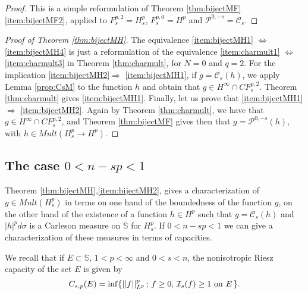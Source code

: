\documentclass[12pt,twoside,leqno,final]{amsart}
\theoremstyle{plain}
\begin{document}
\begin{proof}
This is a simple reformulation of Theorem \ref{thm:bijectMF} \eqref{item:bijectMF2}, applied to $F_s^{p,2}=H_s^p$, $F_s^{p,0}=H^p$ and ${{\mathcal P}}^{0,-s}={\mathcal C}_s$.
\end{proof}

 \begin{proof}[Proof of Theorem \ref{thm:bijectMH}] 

The equivalence \eqref{item:bijectMH1} $\Leftrightarrow$\eqref{item:bijectMH4} is just a reformulation of the equivalence \eqref{item:charmult1} $\Leftrightarrow$ \eqref{item:charmult3} in Theorem \ref{thm:charmult}, for $N=0$ and $q=2$.
For the implication \eqref{item:bijectMH2}$\Rightarrow$ \eqref{item:bijectMH1}, if $g={\mathcal C}_s(h)$, we apply Lemma \ref{prop:CsM} to the function $h$ and obtain that $g\in H^\infty\cap CF^{p,2}_s$. Theorem \ref{thm:charmult} gives \eqref{item:bijectMH1}.
Finally, let us prove that  \eqref{item:bijectMH1}$\Rightarrow$ \eqref{item:bijectMH2}. Again by Theorem \ref{thm:charmult}, we have that $g\in H^\infty\cap CF^{p,2}_s$, and Theorem \ref{thm:bijectMF} gives then that $g={{\mathcal P}}^{0,-s}(h)$, with $h\in Mult(H^p_s\to H^p)$.
\end{proof}
 
 
 
 

\subsection{The case $0<n-sp<1$}

Theorem \ref{thm:bijectMH},\eqref{item:bijectMH2}, gives a characterization of $g\in Mult(H_s^p)$ in terms on one hand of the boundedness of the function $g$, on the other hand of the existence of a function $h\in H^p$ such that $g={\mathcal C}_s(h)$ and $|h|^pd\sigma$ is a Carleson measure on ${{\mathbb S}}$ for $H_s^p$.  
If $0<n-sp<1$ we can give a characterization of these measures in terms of capacities.

We recall that if $E\subset{{\mathbb S}}$, $1<p<\infty$ and $0<s<n$, the nonisotropic Riesz capacity of the set $E$ is given by
$$C_{s,p}(E)= \inf \{||f||_{L^p}^p\,;\, f\geq0,\, \mathcal{I}_s(f)\geq 1 \,\,{\rm on}\,\, E\,\}.$$
 
\end{document}
